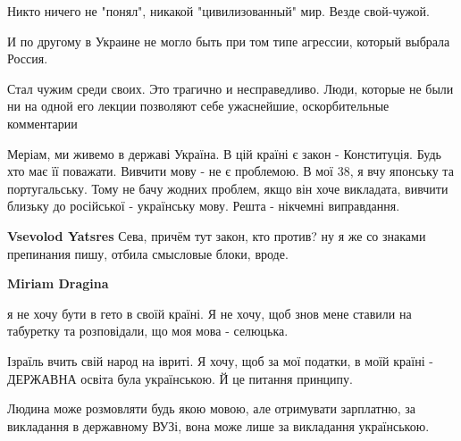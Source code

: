 \begin{itemize}
Никто ничего не "понял", никакой "цивилизованный" мир. Везде свой-чужой.

И по другому в Украине не могло быть при том типе агрессии, который выбрала
Россия.


 

Стал чужим среди своих. Это трагично и несправедливо. Люди, которые не были ни
на одной его лекции позволяют себе ужаснейшие, оскорбительные комментарии

 

Меріам, ми живемо в державі Україна. В цій країні є закон - Конституція. Будь
хто має її поважати. Вивчити мову - не є проблемою. В мої 38, я вчу японську та
португальську. Тому не бачу жодних проблем, якщо він хоче викладата, вивчити
близьку до російської - українську мову. Решта - нікчемні виправдання.

\begin{itemize}
 
\textbf{Vsevolod Yatsres} Сева, причём тут закон, кто против? ну я же со знаками препинания пишу, отбила смысловые блоки, вроде.

 
\textbf{Miriam Dragina} 

я не хочу бути в гето в своїй країні. Я не хочу, щоб знов мене ставили на
табуретку та розповідали, що моя мова - селюцька.

Ізраїль вчить свій народ на івриті. Я хочу, щоб за мої податки, в моїй країні -
ДЕРЖАВНА освіта була українською. Й це питання принципу.

Людина може розмовляти будь якою мовою, але отримувати зарплатню, за викладання
в державному ВУЗі, вона може лише за викладання українською.


\end{itemize}
\end{itemize}
